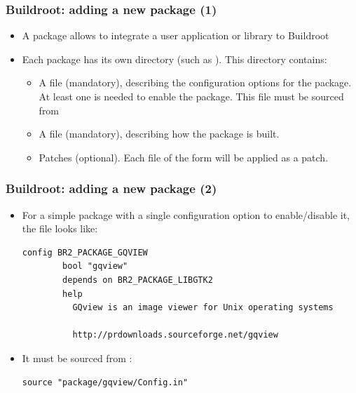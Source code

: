 \begin{frame}
  \frametitle{Buildroot: adding a new package (1)}
  \begin{itemize}
  \item A package allows to integrate a user application or library to
    Buildroot
  \item Each package has its own directory (such as
    ). This directory contains:
    \begin{itemize}
    \item A  file (mandatory), describing the
      configuration options for the package. At least one is needed to
      enable the package. This file must be sourced from
    \item A  file (mandatory), describing how the
      package is built.
    \item Patches (optional). Each file of the form
       will be applied as a patch.
    \end{itemize}
  \end{itemize}
\end{frame}

\begin{frame}[fragile]
  \frametitle{Buildroot: adding a new package (2)}
  \begin{itemize}
  \item For a simple package with a single configuration option to
    enable/disable it, the  file looks like:
\footnotesize
\begin{block}{}
\begin{verbatim}
config BR2_PACKAGE_GQVIEW
        bool "gqview"
        depends on BR2_PACKAGE_LIBGTK2
        help
          GQview is an image viewer for Unix operating systems

          http://prdownloads.sourceforge.net/gqview
\end{verbatim}
\end{block}
\normalsize
  \item It must be sourced from :
\small
\begin{block}{}
\begin{verbatim}
source "package/gqview/Config.in"
\end{verbatim}
\end{block}
  \end{itemize}
\end{frame}

